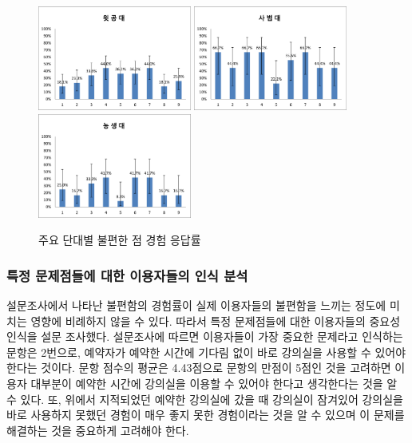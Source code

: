 \documentclass[11pt,a4paper]{article}
\begin{document}
\begin{figure}[h]
\includegraphics[width=0.45\textwidth]{4_1_3_1}
\includegraphics[width=0.45\textwidth]{4_1_3_2}
\includegraphics[width=0.45\textwidth]{4_1_3_3}
\centering
\caption{주요 단대별 불편한 점 경험 응답률}
\label{fig:GraphByCollege}
\end{figure}

\subsubsection{특정 문제점들에 대한 이용자들의 인식 분석}
설문조사에서 나타난 불편함의 경험률이 실제 이용자들의 불편함을 느끼는 정도에
미치는 영향에 비례하지 않을 수 있다. 따라서 특정 문제점들에 대한 이용자들의
중요성 인식을 설문 조사했다. 설문조사에 따르면 이용자들이 가장 중요한 문제라고
인식하는 문항은 2번으로, 예약자가 예약한 시간에 기다림 없이 바로 강의실을
사용할 수 있어야 한다는 것이다. 문항 점수의 평균은 4.43점으로 문항의 만점이
5점인 것을 고려하면 이용자 대부분이 예약한 시간에 강의실을 이용할 수 있어야
한다고 생각한다는 것을 알 수 있다. 또, 위에서 지적되었던 예약한 강의실에 갔을
때 강의실이 잠겨있어 강의실을 바로 사용하지 못했던 경험이 매우 좋지 못한
경험이라는 것을 알 수 있으며 이 문제를 해결하는 것을 중요하게 고려해야 한다.
\end{document}
